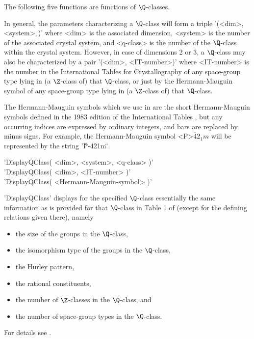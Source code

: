 \vspace{5mm}
The following five functions are functions of $\Q$-classes.

In general,   the parameters characterizing  a  $\Q$-class  will  form  a
triple  '(<dim>,\,<system>,\,<q-class>)'  where <dim>  is  the associated
dimension,  <system> is the number  of the associated crystal system, and
<q-class> is  the number of  the $\Q$-class  within  the  crystal system.
However,  in case of  dimensions  2  or 3, a    $\Q$-class  may  also  be
characterized by  a pair '(<dim>,  <IT-number>)' where <IT-number> is the
number in the International Tables   for Crystallography \cite{Hah83}  of
any space-group type   lying in (a $\Z$-class  of)  that  $\Q$-class,  or
just by the  Hermann-Mauguin symbol of any  space-group type lying  in (a
$\Z$-class of) that $\Q$-class.

The Hermann-Mauguin symbols  which  we use
in  {\GAP} are  the short  Hermann-Mauguin symbols  defined  in the  1983
edition  of the International   Tables \cite{Hah83},   but any  occurring
indices  are expressed  by  ordinary integers,  and bars  are replaced by
minus    signs.     For    example,     the     Hermann-Mauguin    symbol
<P>$\overline{4}2_1m$ will be represented by the string '\"P-421m\"'.

\vspace{5mm}
'DisplayQClass( <dim>, <system>, <q-class> )'%
 \\
'DisplayQClass( <dim>, <IT-number> )' \\
'DisplayQClass( <Hermann-Mauguin-symbol> )'

'DisplayQClass' displays for   the specified $\Q$-class  essentially  the
same  information as  is  provided  for  that  $\Q$-class  in  Table 1 of
\cite{BBNWZ78} (except for the defining relations given there), namely
\vspace{-2mm}
\begin{itemize}
\item the size of the groups in the $\Q$-class,
      \vspace{-2mm}
\item the isomorphism type of the groups in the $\Q$-class,
      \vspace{-2mm}
\item the Hurley pattern,
      \vspace{-2mm}
\item the rational constituents,
      \vspace{-2mm}
\item the number of $\Z$-classes in the $\Q$-class, and
      \vspace{-2mm}
\item the number of space-group types in the $\Q$-class.
      \vspace{-2mm}
\end{itemize}
For details see \cite{BBNWZ78}.

